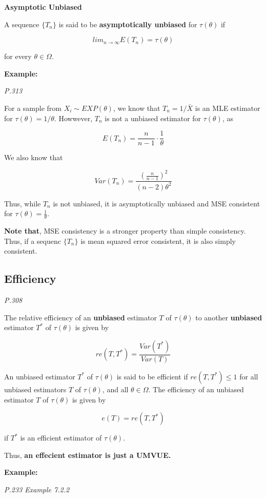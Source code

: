 \documentclass[]{book}
\begin{document}
\textbf{Asymptotic Unbiased}

A sequence \(\{ T_n \}\) is said to be \textbf{asymptotically unbiased} for \(\tau(\theta)\) if

\[lim_{n\rightarrow \infty} E(T_n)=\tau(\theta)\]

for every \(\theta \in \Omega\).

\textbf{Example:}

\emph{P.313}

For a sample from \(X_i \sim EXP(\theta)\), we know that \(T_n=1/ \bar{X}\) is an MLE estimator for \(\tau(\theta)=1/\theta\). Howwever, \(T_n\) is not a unbiased estimator for \(\tau(\theta)\), as

\[E(T_n)=\frac{n}{n-1}\cdot \frac{1}{\theta}\]

We also know that

\[Var(T_n)=\frac{(\frac{n}{n-1})^2}{(n-2)\theta^2}\]

Thus, while \(T_n\) is not unbiased, it is asymptotically unbiased and MSE consistent for \(\tau(\theta)=\frac{1}{\theta}\).

\textbf{Note that}, MSE consistency is a stronger property than simple consistency. Thus, if a sequenc \(\{T_n\}\) is mean squared error consistent, it is also simply consistent.

\hypertarget{efficiency}{%
\subsection{Efficiency}\label{efficiency}}

\emph{P.308}

The relative efficiency of an \textbf{unbiased} estimator \(T\) of \(\tau(\theta)\) to another \textbf{unbiased} estimator \(T^*\) of \(\tau(\theta)\) is given by

\[re(T, T^*)=\frac{Var(T^*)}{Var(T)}\]

An unbiased estimator \(T^*\) of \(\tau(\theta)\) is said to be efficient if \(re(T, T^*) \leq 1\) for all unbiased estimators \(T\) of \(\tau(\theta)\), and all \(\theta \in \Omega\). The efficiency of an unbiased estimator \(T\) of \(\tau(\theta)\) is given by

\[e(T)=re(T, T^*)\]

if \(T^*\) is an efficient estimator of \(\tau(\theta)\).

Thus, \textbf{an effecient estimator is just a UMVUE.}

\textbf{Example:}

\emph{P.233 Example 7.2.2}
\end{document}
